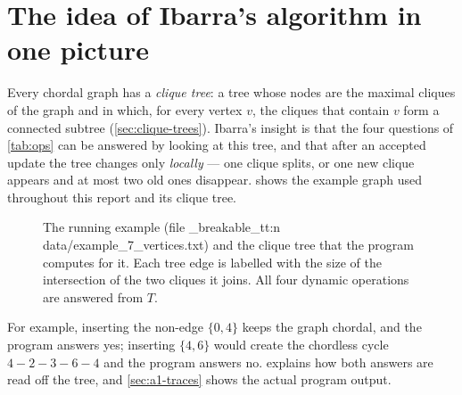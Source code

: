 \documentclass[11pt,a4paper,oneside]{report}
\theoremstyle{plain}
\theoremstyle{definition}
\theoremstyle{remark}
\newcommand{\yes}{\textsf{yes}}
\newcommand{\no}{\textsf{no}}
\DeclareRobustCommand{\file}[1]{\mtp_breakable_tt:n {#1}}
\begin{document}
\section{The idea of Ibarra's algorithm in one picture}
Every chordal graph has a \emph{clique tree}: a tree whose nodes are the maximal cliques of the
graph and in which, for every vertex \(v\), the cliques that contain \(v\) form a connected
subtree (\cref{sec:clique-trees}). Ibarra's insight is that the four questions of
\cref{tab:ops} can be answered by looking at this tree, and that after an accepted update the
tree changes only \emph{locally} --- one clique splits, or one new clique appears and at most
two old ones disappear.  shows the example graph used throughout this report
and its clique tree.

\begin{figure}[ht]
\centering
{}
\caption[The running example and its clique tree]{The running example (file \file{data/example_7_vertices.txt}) and the clique tree that
the program computes for it. Each tree edge is labelled with the size of the intersection of the
two cliques it joins. All four dynamic operations are answered from \(T\).}
\label{fig:overview}
\end{figure}

For example, inserting the non-edge \(\{0,4\}\) keeps the graph chordal, and the program
answers \yes; inserting \(\{4,6\}\) would create the chordless cycle \(4\!-\!2\!-\!3\!-\!6\!-\!4\)
and the program answers \no.  explains how
both answers are read off the tree, and \cref{sec:a1-traces} shows the actual program output.
\end{document}
